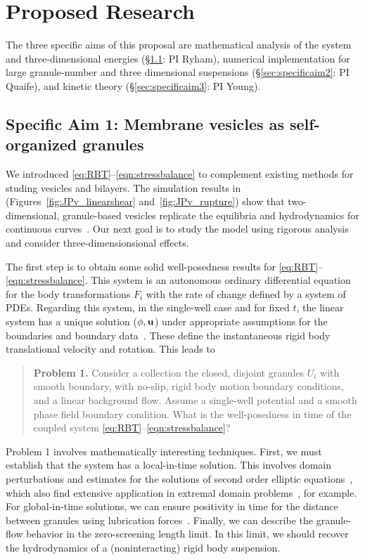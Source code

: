 \section{Proposed Research}
\label{sec:proposed-work}
The three specific aims of this proposal are
mathematical analysis of the system
and three-dimensional energies
(\S \ref{sec:specificaim1}: PI Ryham),
numerical implementation for large granule-number
and three dimensional suspensions
(\S \ref{sec:specificaim2}: PI Quaife),
and kinetic theory
(\S \ref{sec:specificaim3}: PI Young).
\subsection{Specific Aim 1: Membrane vesicles as self-organized granules}
\label{sec:specificaim1}
We introduced \eqref{eq:RBT}--\eqref{eqn:stressbalance} to complement
existing methods for studing vesicles and bilayers. The simulation
results in (Figures~\ref{fig:JPv_linearshear} and~\ref{fig:JPv_rupture})
show that two-dimensional, granule-based vesicles replicate the
equilibria and hydrodynamics for continuous curves~\cite{FuQuRyYo22,
Fu2018_SIAM}. Our next goal is to study the model using rigorous
analysis and consider three-dimensionsional effects. 

The first step is to obtain some solid well-posedness results for
\eqref{eq:RBT}--\eqref{eqn:stressbalance}. This system is an autonomous
ordinary differential equation for the body transformations $F_i$ with
the rate of change defined by a system of PDEs. Regarding this system,
in the single-well case and for fixed $t$, the linear system has a
unique solution ($\phi, \mathbf{u}$) under appropriate assumptions for the
boundaries and boundary data~\cite{manasthesis, rac-gre2016, LAX}. These
define the instantaneous rigid body translational velocity and rotation.
This leads to 
\begin{quotation}
  \noindent
  \textbf{Problem 1.} 
  Consider a collection the closed, disjoint granules $U_i$ with smooth
  boundary, with no-slip, rigid body motion boundary conditions, and a
  linear background flow. Assume a single-well potential and a smooth
  phase field boundary condition. What is the well-posedness in time of
  the coupled system \eqref{eq:RBT}--\eqref{eqn:stressbalance}?
\end{quotation}
Problem 1 involves mathematically interesting techniques. First, we
must establish that the system has a local-in-time solution. This
involves domain perturbations and estimates for the solutions of second
order elliptic equations~\cite{Savar2002DomainPA, DANERS20081,
Lamboley2015EstimatesOF}, which also find extensive application in
extremal domain problems~\cite{Schiffer1954VariationOD,
Henrot2006ExtremumPF, bogosel:hal-03607776,Bogosel2022OnTP}, for
example. For global-in-time solutions, we can ensure positivity in time
for the distance between granules using lubrication
forces~\cite{cawthorn_balmforth_2010, leal_2007}. Finally, we can
describe the granule-flow behavior in the zero-screening length limit.
In this limit, we should recover the hydrodynamics of a (noninteracting)
rigid body suspension. 

